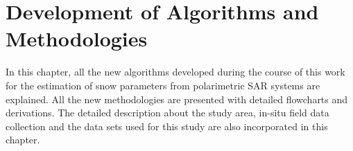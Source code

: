 \chapter{Development of Algorithms and Methodologies}
\label{sec:3}
In this chapter, all the new algorithms developed during the course of this work for the estimation of snow parameters from polarimetric SAR systems are explained. All the new methodologies are presented with detailed flowcharts and derivations. The detailed description about the study area, in-situ field data collection and the data sets used for this study are also incorporated in this chapter.

